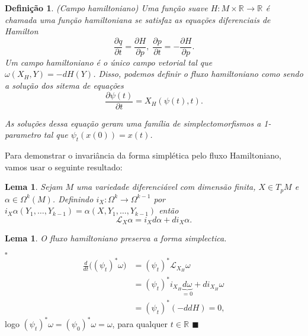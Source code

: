 \documentclass[12pt]{book}
\newtheorem{lema}[teorema]{Lema}
\newtheorem{definicao}[teorema]{Definição}
\newenvironment{prova}[1]{$\square$ #1}{\hfill$\blacksquare$}
\newcommand{\bigparenteses}[1]{\big( #1 \big) }
\newcommand{\derivadaparcial}[2]{\frac{\partial #1}{\partial #2}}
\newcommand{\liederivada}[1]{\mathcal{L}_{#1}}
\newcommand{\real}[1]{\mathbb{R}^{#1}}
\begin{document}
	\begin{definicao}
		(Campo hamiltoniano) Uma função suave $H : M \times \real{} \to \real{}$ é chamada uma função hamiltoniana se satisfaz as equações diferenciais de Hamilton
		$$
		\frac{\partial q}{\partial t} = \frac{\partial H}{\partial p}, \; \frac{\partial p}{\partial t} = -\frac{\partial H}{\partial p}. 
		$$
		Um campo hamiltoniano é o único campo vetorial tal que $\omega(X_{H}, Y) = -dH(Y)$. Disso, podemos definir o fluxo hamiltoniano como sendo a solução dos sitema de equações 
		$$
		\label{sisHamilt}
		\derivadaparcial{\psi(t)}{t} = X_{H}(\psi(t), t).
		$$
		
		As soluções dessa equação geram uma família de simplectomorfismos a 1-parametro tal que $\psi_{t}(x(0)) = x(t)$.
	\end{definicao}
	Para demonstrar o invariância da forma simplética pelo fluxo Hamiltoniano, vamos usar o seguinte resultado:
	\begin{lema}
		Sejam $M$ uma variedade diferenciável com dimensão finita, $X \in T_{p}M$ e $\alpha \in \Omega^{k}(M)$. Definindo $i_{X}:\Omega^{k} \to \Omega^{k-1}$ por $i_{X}\alpha(Y_{1}, \dots, Y_{k-1}) = \alpha(X, Y_{1}, \dots, Y_{k-1})$ então
		$$
		\liederivada{X}\alpha = i_{X}d\alpha + di_{X}\alpha.
		$$
	\end{lema}
	\begin{lema}
		O fluxo hamiltoniano preserva a forma simplectica.
	\end{lema}
	\begin{prova}\label{fluxo_convervativo}
		$$
		\begin{aligned}
		\frac{d}{dt}\bigparenteses{(\psi_{t})^{*}\omega} 
		&= (\psi_{t})^{*} \liederivada{X_{H}}\omega  
		\\
		&= (\psi_{t})^{*} i_{X_{H}}\underbrace{d\omega }_ {=0}+ di_{X_{H}}\omega 
		\\
		&= (\psi_{t})^{*} (-ddH)=0,
		\end{aligned}
		$$
		logo $(\psi_{t})^{*} \omega = (\psi_{0})^{*} \omega = \omega$, para qualquer $t \in \real{}$
	\end{prova}
	
\end{document}
